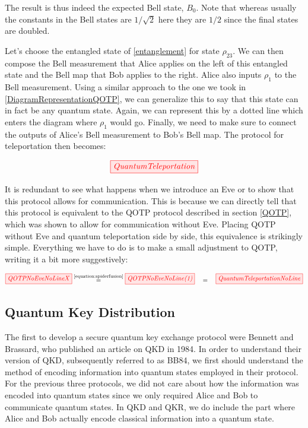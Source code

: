 \documentclass[]{article}
\newcommand{\equaltext}[1]{\ensuremath{\stackrel{\text{#1}}{=}}}
\begin{document}
The result is thus indeed the expected Bell state, $B_0$. Note that whereas usually the constants in the Bell states are $1/\sqrt{2}$ here they are $1/2$ since the final states are doubled.

Let's choose the entangled state of \ref{entanglement} for state $\rho_{23}$. We can then compose the Bell measurement that Alice applies on the left of this entangled state and the Bell map that Bob applies to the right. Alice also inputs $\rho_1$ to the Bell measurement. Using a similar approach to the one we took in \ref{DiagramRepresentationQOTP}, we can generalize this to say that this state can in fact be any quantum state. Again, we can represent this by a dotted line which enters the diagram where $\rho_1$ would go. Finally, we need to make sure to connect the outputs of Alice's Bell measurement to Bob's Bell map. The protocol for teleportation then becomes: 
 
\begin{equation}
	\label{equation:quantumteleportation}
	\tikzfig{QuantumTeleportation}
\end{equation}
 
It is redundant to see what happens when we introduce an Eve or to show that this protocol allows for communication. This is because we can directly tell that this protocol is equivalent to the QOTP protocol described in section \ref{QOTP}, which was shown to allow for communication without Eve. Placing QOTP without Eve and quantum teleportation side by side, this equivalence is strikingly simple. Everything we have to do is to make a small adjustment to QOTP, writing it a bit more suggestively:

\begin{equation}
\label{equation:QOTPQuantumTeleportationEquivalence}
\tikzfig{QOTPNoEveNoLineX} \equaltext{\ref{equation:spiderfusion}} \tikzfig{QOTPNoEveNoLine(1)}~~~ = ~~~\tikzfig{QuantumTeleportationNoLine}
\end{equation}
 
\subsection{Quantum Key Distribution}

\label{QuantumKeyDistribution}

The first to develop a secure quantum key exchange protocol were Bennett and Brassard, who published an article on QKD in 1984. In order to understand their version of QKD, subsequently referred to as BB84, we first should understand the method of encoding information into quantum states employed in their protocol. For the previous three protocols, we did not care about how the information was encoded into quantum states since we only required Alice and Bob to communicate quantum states. In QKD and QKR, we do include the part where Alice and Bob actually encode classical information into a quantum state.
\end{document}
